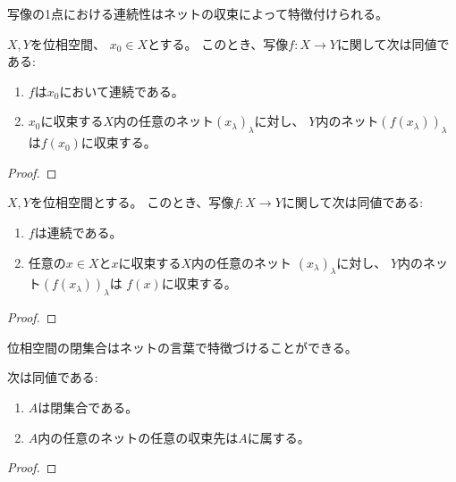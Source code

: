 \documentclass[report]{jlreq}
\begin{document}
写像の1点における連続性はネットの収束によって特徴付けられる。

\begin{theorem}[1点における連続性の特徴付け]
    $X, Y$を位相空間、
    $x_0 \in X$とする。
    このとき、写像$f \colon X \to Y$に関して次は同値である:
    \begin{enumerate}
        \item $f$は$x_0$において連続である。
        \item $x_0$に収束する$X$内の任意のネット$(x_\lambda)_\lambda$に対し、
            $Y$内のネット$(f(x_\lambda))_\lambda$は$f(x_0)$に収束する。
    \end{enumerate}
\end{theorem}

\begin{proof}
    \TODO{}
\end{proof}

\begin{corollary}[連続写像の特徴付け]
    $X, Y$を位相空間とする。
    このとき、写像$f \colon X \to Y$に関して次は同値である:
    \begin{enumerate}
        \item $f$は連続である。
        \item 任意の$x \in X$と$x$に収束する$X$内の任意のネット
            $(x_\lambda)_\lambda$に対し、
            $Y$内のネット$(f(x_\lambda))_\lambda$は
            $f(x)$に収束する。
    \end{enumerate}
\end{corollary}

\begin{proof}
    \TODO{}
\end{proof}

位相空間の閉集合はネットの言葉で特徴づけることができる。

\begin{theorem}
    次は同値である:
    \begin{enumerate}
        \item $A$は閉集合である。
        \item $A$内の任意のネットの任意の収束先は$A$に属する。
    \end{enumerate}
\end{theorem}

\begin{proof}
    \TODO{}
\end{proof}




%
\end{document}

